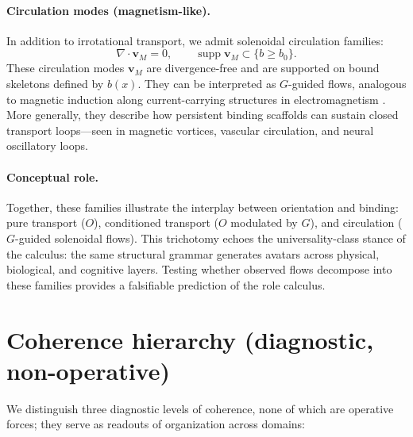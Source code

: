 \documentclass[12pt,a4paper,oneside]{scrreprt}
\begin{document}
\paragraph{Circulation modes (magnetism-like).} 
In addition to irrotational transport, we admit solenoidal circulation families:
\[
\nabla \!\cdot \mathbf v_M = 0, 
\qquad \operatorname{supp} \mathbf v_M \subset \{ b \ge b_0 \}.
\]
These circulation modes $\mathbf v_M$ are divergence-free and are supported 
on bound skeletons defined by $b(x)$. 
They can be interpreted as $G$-guided flows, analogous to magnetic induction 
along current-carrying structures in electromagnetism \citep{Jackson1999Classical}. 
More generally, they describe how persistent binding scaffolds can sustain 
closed transport loops—seen in magnetic vortices, vascular circulation, 
and neural oscillatory loops. 

\paragraph{Conceptual role.} 
Together, these families illustrate the interplay between orientation and binding: 
pure transport ($O$), conditioned transport ($O$ modulated by $G$), 
and circulation ($G$-guided solenoidal flows). 
This trichotomy echoes the universality-class stance of the calculus: 
the same structural grammar generates avatars across physical, biological, 
and cognitive layers. 
Testing whether observed flows decompose into these families provides 
a falsifiable prediction of the role calculus.

\section{Coherence hierarchy (diagnostic, non-operative)}\label{sec:ur-coherence-hierarchy}

We distinguish three diagnostic levels of coherence, none of which are operative forces; 
they serve as readouts of organization across domains:
\end{document}
